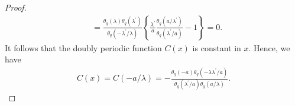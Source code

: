 \documentclass[10pt,a4paper]{article}
\numberwithin{equation}{section}
\theoremstyle{definition}
\begin{document}
\begin{proof}
\begin{align*}
&=\frac{\theta_q(\lambda)\theta_q(\lambda^{\prime})}{\theta_q(-\lambda^{\prime}/\lambda)}\left\{\frac{\lambda^{\prime}}{a} \frac{\theta_q(a/\lambda^{\prime})}{\theta_q(\lambda^{\prime}/a)}-1\right\}=0.
\end{align*}
It follows that the doubly periodic function $C(x)$ is constant in $x$.
Hence, we have
\begin{gather*}
C(x)=C(-a/\lambda)=-\frac{\theta_q(-a)\theta_q(-\lambda\lambda^{\prime}/a)}{\theta_q(\lambda^{\prime}/a)\theta_q(a/\lambda)}.\tag*{\qed}
\end{gather*}\renewcommand{\qed}{}
\end{proof}
\end{document}
